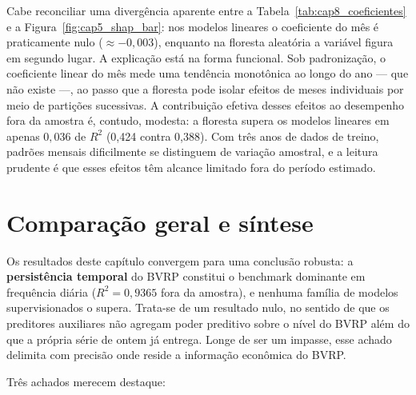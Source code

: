 Cabe reconciliar uma divergência aparente entre a Tabela~\ref{tab:cap8_coeficientes}
e a Figura~\ref{fig:cap5_shap_bar}: nos modelos lineares o coeficiente do mês é
praticamente nulo ($\approx -0{,}003$), enquanto na floresta aleatória a variável
figura em segundo lugar. A explicação está na forma funcional. Sob padronização,
o coeficiente linear do mês mede uma tendência monotônica ao longo do ano --- que
não existe ---, ao passo que a floresta pode isolar efeitos de meses individuais
por meio de partições sucessivas. A contribuição efetiva desses efeitos ao
desempenho fora da amostra é, contudo, modesta: a floresta supera os modelos
lineares em apenas $0{,}036$ de $R^2$ (0,424 contra 0,388). Com três anos de dados
de treino, padrões mensais dificilmente se distinguem de variação amostral, e a
leitura prudente é que esses efeitos têm alcance limitado fora do período estimado.

\section{Comparação geral e síntese}
\label{sec:cap5_comparacao}

Os resultados deste capítulo convergem para uma conclusão robusta: a
\textbf{persistência temporal} do BVRP constitui o benchmark dominante em
frequência diária ($R^2 = 0{,}9365$ fora da amostra), e nenhuma família de modelos
supervisionados o supera. Trata-se de um resultado nulo, no sentido de que os
preditores auxiliares não agregam poder preditivo sobre o nível do BVRP além do
que a própria série de ontem já entrega. Longe de ser um impasse, esse achado
delimita com precisão onde reside a informação econômica do BVRP.

Três achados merecem destaque:

